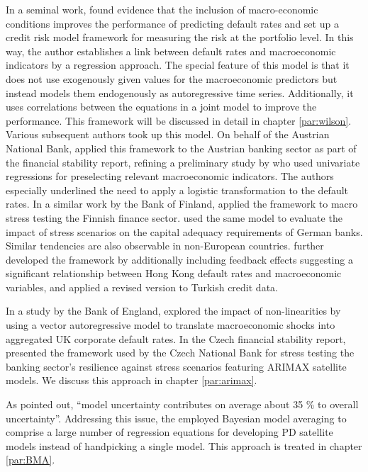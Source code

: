 \documentclass[a4paper, 11pt]{scrreprt}
\begin{document}
In a seminal work, \textcite{wilson1997wilsonI} found evidence that the inclusion of macro-economic conditions improves the performance of predicting default rates and set up a credit risk model framework for measuring the risk at the portfolio level. In this way, the author establishes a link between default rates and macroeconomic indicators by a regression approach. The special feature of this model is that it does not use exogenously given values for the macroeconomic predictors but instead models them endogenously as autoregressive time series. Additionally, it uses correlations between the equations in a joint model to improve the performance. This framework will be discussed in detail in chapter \ref{par:wilson}. Various subsequent authors took up this model.
On behalf of the Austrian National Bank, \textcite{boss2002austria} applied this framework to the Austrian banking sector as part of the financial stability report, refining a preliminary study by \textcite{kalirai2002austria} who used univariate regressions for preselecting relevant macroeconomic indicators. The authors especially underlined the need to apply a logistic transformation to the default rates.
In a similar work by the Bank of Finland, \textcite{virolainen2004finland} applied the \textcite{wilson1997wilsonI} framework to macro stress testing the Finnish finance sector.
\textcite{buhn2007germany} used the same model to evaluate the impact of stress scenarios on the capital adequacy requirements of German banks.
Similar tendencies are also observable in non-European countries.
\textcite{wong2006framework} further developed the \textcite{wilson1997wilsonI} framework by additionally including feedback effects suggesting a significant relationship between Hong Kong default rates and macroeconomic variables, and \textcite{kuccukozmen2006turkey} applied a revised version to Turkish credit data.

In a study by the Bank of England, \textcite{drehmann2006nonlinearities} explored the impact of non-linearities by using a vector autoregressive model to translate macroeconomic shocks into aggregated UK corporate default rates.
In the Czech financial stability report, \textcite{gersl2012dynamic} presented the framework used by the Czech National Bank for stress testing the banking sector's resilience against stress scenarios featuring ARIMAX satellite models. We discuss this approach in chapter \ref{par:arimax}.

As \textcite{gross2017implications} pointed out, ``model uncertainty contributes on average about 35 \% to overall uncertainty''. Addressing this issue, the \textcite{ecb2017stampe} employed Bayesian model averaging to comprise a large number of regression equations for developing PD satellite models instead of handpicking a single model. This approach is treated in chapter \ref{par:BMA}.
\end{document}
